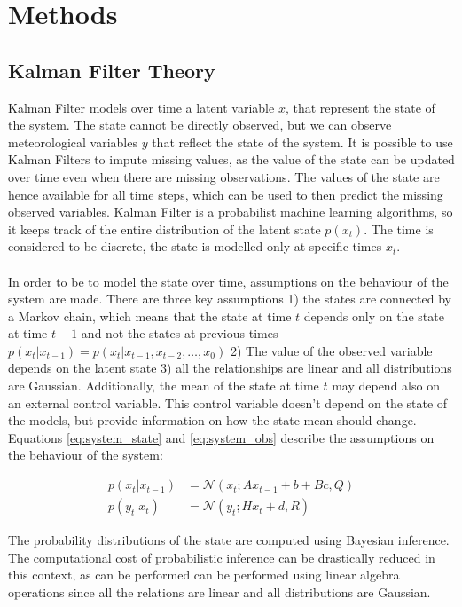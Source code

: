 \documentclass{article}
\newcommand{\norm}[3]{\mathcal{N}\left(#1; #2, #3\right)} %
\let\Oldsection\section
\renewcommand{\section}{\FloatBarrier\Oldsection}
\let\Oldsubsection\subsection
\renewcommand{\subsection}{\FloatBarrier\Oldsubsection}
\begin{document}
\section{Methods}

\subsection{Kalman Filter Theory}

Kalman Filter models over time a latent variable $x$, that represent the state of the system. The state cannot be directly observed, but we can observe meteorological variables $y$ that reflect the state of the system. It is possible to use Kalman Filters to impute missing values, as the value of the state can be updated over time even when there are missing observations. The values of the state are hence available for all time steps, which can be used to then predict the missing observed variables.
Kalman Filter is a probabilist machine learning algorithms, so it keeps track of the entire distribution of the latent state $p(x_t)$. The time is considered to be discrete, the state is modelled only at specific times $x_t$.  

\paragraph{} In order to be to model the state over time, assumptions on the behaviour of the system are made. There are three key assumptions 1) the states are connected by a Markov chain, which means that the state at time $t$ depends only on the state at time $t-1$ and not the states at previous times $p(x_t|x_{t-1}) = p(x_t|x_{t-1}, x_{t-2}, \hdots, x_0)$ 2) The value of the observed variable depends on the latent state 3) all the relationships are linear and all distributions are Gaussian. Additionally, the mean of the state at time $t$ may depend also on an external control variable. This control variable doesn't depend on the state of the models, but provide information on how the state mean should change.
Equations \ref{eq:system_state} and \ref{eq:system_obs} describe the assumptions on the behaviour of the system:

\begin{align}
p(x_t | x_{t-1}) &= \norm{x_t}{Ax_{t-1} + b + Bc}{Q} \label{eq:system_state}\\
p(y_t | x_t) &= \norm{y_t}{Hx_t + d}{R} \label{eq:system_obs}
\end{align}

The probability distributions of the state are computed using Bayesian inference. The computational cost of probabilistic inference can be drastically reduced in this context, as can be performed can be performed using linear algebra operations since all the relations are linear and all distributions are Gaussian.
\end{document}
